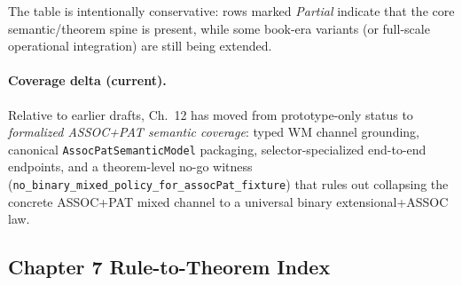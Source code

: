 \documentclass[]{article}
\newcommand{\code}[1]{\texttt{#1}}
\begin{document}
The table is intentionally conservative: rows marked \emph{Partial} indicate that the core
semantic/theorem spine is present, while some book-era variants (or full-scale operational
integration) are still being extended.

\paragraph{Coverage delta (current).}
Relative to earlier drafts, Ch.\ 12 has moved from prototype-only status to
\emph{formalized ASSOC+PAT semantic coverage}: typed WM channel grounding, canonical
\code{AssocPatSemanticModel} packaging, selector-specialized end-to-end endpoints, and a
theorem-level no-go witness (\code{no\_binary\_mixed\_policy\_for\_assocPat\_fixture}) that rules out
collapsing the concrete ASSOC+PAT mixed channel to a universal binary extensional+ASSOC law.

\subsection{Chapter 7 Rule-to-Theorem Index}
\label{app:ch7-theorem-index}
\end{document}
